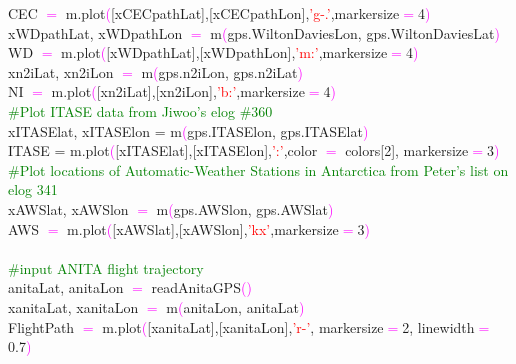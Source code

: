 {\indent CEC \textcolor{magenta}{$=$}  m.plot\textcolor{magenta}{(}[xCECpathLat],[xCECpathLon],\textcolor{red}{'g-.'},markersize\textcolor{magenta}{$=$}4\textcolor{magenta}{)} \\
\indent xWDpathLat, xWDpathLon \textcolor{magenta}{$=$} m\textcolor{magenta}{(}gps.WiltonDaviesLon, gps.WiltonDaviesLat\textcolor{magenta}{)} \\
\indent WD \textcolor{magenta}{$=$} m.plot\textcolor{magenta}{(}[xWDpathLat],[xWDpathLon],\textcolor{red}{'m:'},markersize\textcolor{magenta}{$=$}4\textcolor{magenta}{)} \\
\indent xn2iLat, xn2iLon \textcolor{magenta}{$=$} m\textcolor{magenta}{(}gps.n2iLon, gps.n2iLat\textcolor{magenta}{)} \\
\indent NI \textcolor{magenta}{$=$}  m.plot\textcolor{magenta}{(}[xn2iLat],[xn2iLon],\textcolor{red}{'b:'},markersize\textcolor{magenta}{$=$}4\textcolor{magenta}{)} \\
\indent \textcolor{green}{\#Plot ITASE data from Jiwoo's elog \#360} \\
\indent xITASElat, xITASElon = m\textcolor{magenta}{(}gps.ITASElon, gps.ITASElat\textcolor{magenta}{)} \\
\indent ITASE = m.plot\textcolor{magenta}{(}[xITASElat],[xITASElon],\textcolor{red}{':'},color \textcolor{magenta}{$=$} colors[2], markersize\textcolor{magenta}{$=$}3\textcolor{magenta}{)}
\\
\indent \textcolor{green}{\#Plot locations of Automatic-Weather Stations in Antarctica from Peter's list on elog 341} \\
\indent xAWSlat, xAWSlon \textcolor{magenta}{$=$} m\textcolor{magenta}{(}gps.AWSlon, gps.AWSlat\textcolor{magenta}{)} \\
\indent AWS \textcolor{magenta}{$=$} m.plot\textcolor{magenta}{(}[xAWSlat],[xAWSlon],\textcolor{red}{'kx'},markersize\textcolor{magenta}{$=$}3\textcolor{magenta}{)} \\
\\
\indent \textcolor{green}{\#input ANITA flight trajectory} \\
\indent anitaLat, anitaLon \textcolor{magenta}{$=$} readAnitaGPS\textcolor{magenta}{(}\textcolor{magenta}{)} \\
\indent xanitaLat, xanitaLon \textcolor{magenta}{$=$} m\textcolor{magenta}{(}anitaLon, anitaLat\textcolor{magenta}{)} \\
\indent FlightPath \textcolor{magenta}{$=$} m.plot\textcolor{magenta}{(}[xanitaLat],[xanitaLon],\textcolor{red}{'r-'}, markersize\textcolor{magenta}{$=$}2, linewidth\textcolor{magenta}{$=$}0.7\textcolor{magenta}{)} \\
}
